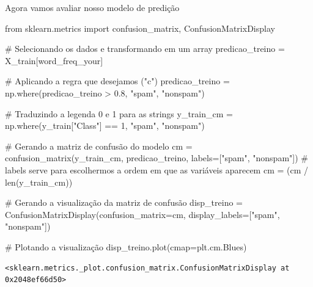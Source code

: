 \documentclass[
  letterpaper,
  DIV=11,
  numbers=noendperiod]{scrreprt}
\newenvironment{Shaded}{\begin{snugshade}}{\end{snugshade}}
\newcommand{\BuiltInTok}[1]{\textcolor[rgb]{0.00,0.23,0.31}{#1}}
\newcommand{\CommentTok}[1]{\textcolor[rgb]{0.37,0.37,0.37}{#1}}
\newcommand{\DecValTok}[1]{\textcolor[rgb]{0.68,0.00,0.00}{#1}}
\newcommand{\FloatTok}[1]{\textcolor[rgb]{0.68,0.00,0.00}{#1}}
\newcommand{\ImportTok}[1]{\textcolor[rgb]{0.00,0.46,0.62}{#1}}
\newcommand{\NormalTok}[1]{\textcolor[rgb]{0.00,0.23,0.31}{#1}}
\newcommand{\OperatorTok}[1]{\textcolor[rgb]{0.37,0.37,0.37}{#1}}
\newcommand{\StringTok}[1]{\textcolor[rgb]{0.13,0.47,0.30}{#1}}
\begin{document}
Agora vamos avaliar nosso modelo de predição

\begin{Shaded}
\begin{Highlighting}[]
\ImportTok{from}\NormalTok{ sklearn.metrics }\ImportTok{import}\NormalTok{ confusion\_matrix, ConfusionMatrixDisplay}
\end{Highlighting}
\end{Shaded}

\begin{Shaded}
\begin{Highlighting}[]
\CommentTok{\# Selecionando os dados e transformando em um array}
\NormalTok{predicao\_treino }\OperatorTok{=}\NormalTok{ X\_train[}\StringTok{\textquotesingle{}word\_freq\_your\textquotesingle{}}\NormalTok{]}

\CommentTok{\# Aplicando a regra que desejamos ("c")}
\NormalTok{predicao\_treino }\OperatorTok{=}\NormalTok{ np.where(predicao\_treino }\OperatorTok{\textgreater{}} \FloatTok{0.8}\NormalTok{, }\StringTok{"spam"}\NormalTok{, }\StringTok{"nonspam"}\NormalTok{)}

\CommentTok{\# Traduzindo a legenda 0 e 1 para as strings}
\NormalTok{y\_train\_cm }\OperatorTok{=}\NormalTok{ np.where(y\_train[}\StringTok{"Class"}\NormalTok{] }\OperatorTok{==} \DecValTok{1}\NormalTok{, }\StringTok{"spam"}\NormalTok{, }\StringTok{"nonspam"}\NormalTok{)}

\CommentTok{\# Gerando a matriz de confusão do modelo}
\NormalTok{cm }\OperatorTok{=}\NormalTok{ confusion\_matrix(y\_train\_cm, predicao\_treino, labels}\OperatorTok{=}\NormalTok{[}\StringTok{"spam"}\NormalTok{, }\StringTok{"nonspam"}\NormalTok{]) }\CommentTok{\# labels serve para escolhermos a ordem em que as variáveis aparecem}
\NormalTok{cm }\OperatorTok{=}\NormalTok{ (cm }\OperatorTok{/} \BuiltInTok{len}\NormalTok{(y\_train\_cm))}

\CommentTok{\# Gerando a visualização da matriz de confusão}
\NormalTok{disp\_treino }\OperatorTok{=}\NormalTok{ ConfusionMatrixDisplay(confusion\_matrix}\OperatorTok{=}\NormalTok{cm, display\_labels}\OperatorTok{=}\NormalTok{[}\StringTok{"spam"}\NormalTok{, }\StringTok{"nonspam"}\NormalTok{])}

\CommentTok{\# Plotando a visualização}
\NormalTok{disp\_treino.plot(cmap}\OperatorTok{=}\NormalTok{plt.cm.Blues)}
\end{Highlighting}
\end{Shaded}

\begin{verbatim}
<sklearn.metrics._plot.confusion_matrix.ConfusionMatrixDisplay at 0x2048ef66d50>
\end{verbatim}
\end{document}
